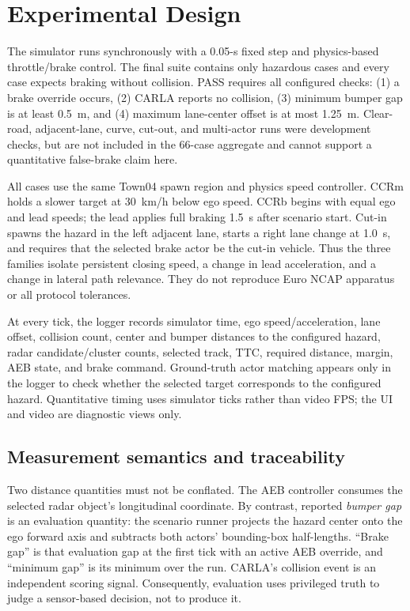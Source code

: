 \documentclass[conference]{IEEEtran}
\begin{document}
\section{Experimental Design}
The simulator runs synchronously with a 0.05-s fixed step and physics-based
throttle/brake control. The final suite contains only hazardous cases and every
case expects braking without collision. PASS requires all configured checks:
(1) a brake override occurs, (2) CARLA reports no collision, (3) minimum bumper
gap is at least 0.5~m, and (4) maximum lane-center offset is at most 1.25~m.
Clear-road, adjacent-lane, curve, cut-out, and multi-actor runs were development
checks, but are not included in the 66-case aggregate and cannot support a
quantitative false-brake claim here.

All cases use the same Town04 spawn region and physics speed controller. CCRm
holds a slower target at 30~km/h below ego speed. CCRb begins with equal ego and
lead speeds; the lead applies full braking 1.5~s after scenario start. Cut-in
spawns the hazard in the left adjacent lane, starts a right lane change at 1.0~s,
and requires that the selected brake actor be the cut-in vehicle. Thus the three
families isolate persistent closing speed, a change in lead acceleration, and a
change in lateral path relevance. They do not reproduce Euro NCAP apparatus or
all protocol tolerances.

At every tick, the logger records simulator time, ego speed/acceleration, lane
offset, collision count, center and bumper distances to the configured hazard,
radar candidate/cluster counts, selected track, TTC, required distance, margin,
AEB state, and brake command. Ground-truth actor matching appears only in the
logger to check whether the selected target corresponds to the configured
hazard. Quantitative timing uses simulator ticks rather than video FPS; the UI
and video are diagnostic views only.

\subsection{Measurement semantics and traceability}
Two distance quantities must not be conflated. The AEB controller consumes the
selected radar object's longitudinal coordinate. By contrast, reported
\emph{bumper gap} is an evaluation quantity: the scenario runner projects the
hazard center onto the ego forward axis and subtracts both actors' bounding-box
half-lengths. ``Brake gap'' is that evaluation gap at the first tick with an
active AEB override, and ``minimum gap'' is its minimum over the run. CARLA's
collision event is an independent scoring signal. Consequently, evaluation
uses privileged truth to judge a sensor-based decision, not to produce it.
\end{document}
